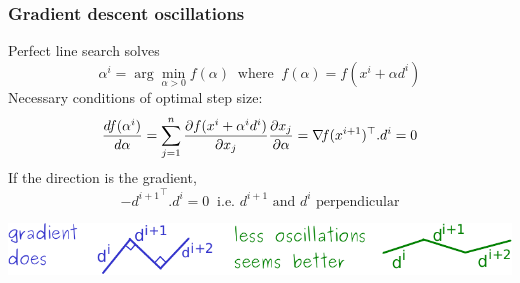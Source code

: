\documentclass[12pt]{beamer}
\begin{document}



\begin{frame}
\frametitle{Gradient descent oscillations} 
Perfect line search solves
\begin{equation*}
\alpha^i = \arg\min_{\alpha>0} f(\alpha) ~\text{ where }~ f(\alpha) = f(x^i+\alpha d^i) 
\end{equation*}
Necessary conditions of optimal step size: 
\begin{equation*}
\frac{df(\alpha^i)}{d\alpha} = \sum_{j=1}^n \frac{\partial f(x^i + \alpha^i d^i)}{\partial x_j} \frac{\partial x_j}{\partial \alpha}
= \nabla\!{f}(x^{i+1})^\top . d^i = 0
\end{equation*}
If the direction is the gradient, 
\begin{equation*}
{-d^{i+1}}^\top . d^i = 0 ~\text{ i.e. } d^{i+1} \text{ and } d^i \text{ perpendicular}
\end{equation*}
\begin{center}
\includegraphics[width=\textwidth]{oscillations-crop.pdf} 
\end{center}
\end{frame}
\end{document}
